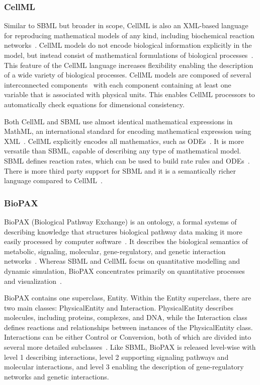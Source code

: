 \documentclass[12pt]{report}
\begin{document}
\subsubsection{CellML}
Similar to SBML but broader in scope, CellML is also an XML-based language for reproducing mathematical models of any kind, including biochemical reaction networks~\cite{Beard2009}. CellML models do not encode biological information explicitly in the model, but instead consist of mathematical formulations of biological processes~\cite{Wimalaratne2009}. This feature of the CellML language increases flexibility enabling the description of a wide variety of biological processes. CellML models are composed of several interconnected components~\cite{Mesiti} with each component containing at least one variable that is associated with physical units.  This enables CellML processors to automatically check equations for dimensional consistency. 


Both CellML and SBML use almost identical mathematical expressions in MathML, an international standard for encoding mathematical expression using XML~\cite{Caprotti1999}. CellML explicitly encodes all mathematics, such as ODEs~\cite{Smith2013}. It is more versatile than SBML, capable of describing any type of mathematical model. SBML defines reaction rates, which can be used to build rate rules and ODEs~\cite{Hucka2015}. There is more third party support for SBML and it is a semantically richer language compared to CellML~\cite{machado_modeling_2011, Smith2013}.


\subsubsection{BioPAX}
BioPAX (Biological Pathway Exchange) is an ontology, a formal systems of describing knowledge that structures biological pathway data making it more easily processed by computer software~\cite{demir_biopax_2010}. It describes the biological semantics of metabolic, signaling, molecular, gene-regulatory, and genetic interaction networks~\cite{demir_biopax_2010}. Whereas SBML and CellML focus on quantitative modelling and dynamic simulation, BioPAX concentrates primarily on quantitative processes and visualization~\cite{demir_biopax_2010, buchel_qualitative_2012}.  

BioPAX contains one superclass, Entity. Within the Entity superclass, there are two main classes: PhysicalEntity and Interaction. PhysicalEntity describes molecules, including proteins, complexes, and DNA, while the Interaction class defines reactions and relationships between instances of the PhysicalEntity class. Interactions can be either Control or Conversion, both of which are divided into several more detailed subclasses~\cite{demir_biopax_2010, buchel_qualitative_2012}. Like SBML, BioPAX is released level-wise with level 1 describing interactions, level 2 supporting signaling pathways and molecular interactions, and level 3 enabling the description of gene-regulatory networks and genetic interactions.
\end{document}
